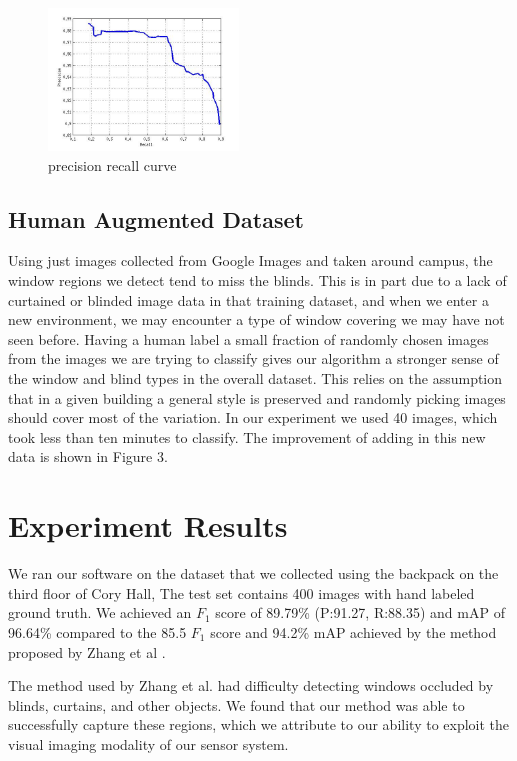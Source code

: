 \documentclass[10pt,twocolumn,letterpaper]{article}
\begin{document}
\begin{figure}[b]
\centering
\includegraphics[width=0.45\textwidth]{plots/pr.jpg}
\caption{precision recall curve}
\end{figure}


\subsection{Human Augmented Dataset}
Using just images collected from Google Images and taken around campus, the window regions we detect tend to miss the blinds. This is in part due to a lack of curtained or blinded image data in that training dataset, and when we enter a new environment, we may encounter a type of window covering we may have not seen before. Having a human label a small fraction of randomly chosen images from the images we are trying to classify gives our algorithm a stronger sense of the window and blind types in the overall dataset. This relies on the assumption that in a given building a general style is preserved and randomly picking images should cover most of the variation. In our experiment we used 40 images, which took less than ten minutes to classify. The improvement of adding in this new data is shown in Figure 3.  

\section{Experiment Results}
We ran our software on the dataset that we collected using the backpack on the third floor of Cory Hall, The test set contains 400 images with hand labeled ground truth. We achieved an $F_1$ score of 89.79\% (P:91.27, R:88.35) and mAP of 96.64\% compared to the 85.5 $F_1$ score and 94.2\% mAP achieved by the method proposed by Zhang et al \cite{rzhang}. 

The method used by Zhang et al. had difficulty detecting windows occluded by blinds, curtains, and other objects. We found that our method was able to successfully capture these regions, which we attribute to our ability to exploit the visual imaging modality of our sensor system.
\end{document}
